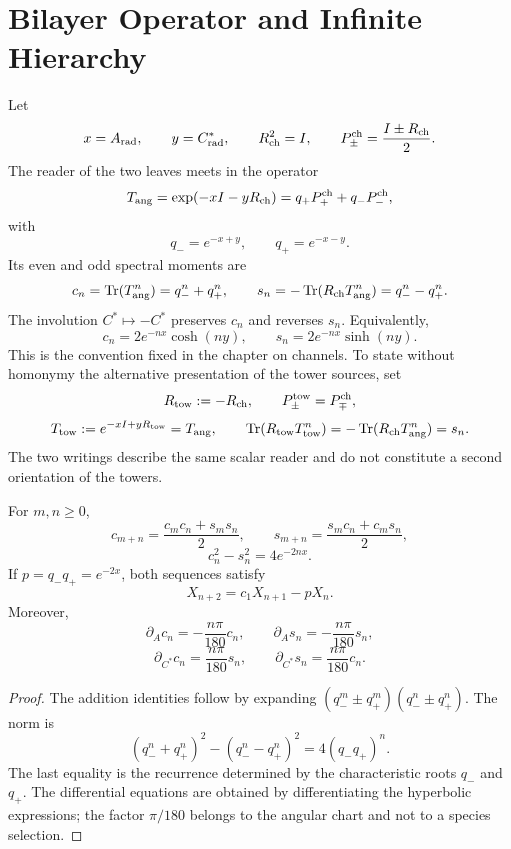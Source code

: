 \section{Bilayer Operator and Infinite Hierarchy}
\label{sec:jerarquia-espectral-infinita-rev7}

Let
\[
 x=A_{\rm rad},\qquad y=C^*_{\rm rad},\qquad
 R_{\rm ch}^2=I,\qquad
 P_\pm^{\rm ch}=\frac{I\pm R_{\rm ch}}2.
\]
The reader of the two leaves meets in the operator
\[
 T_{\rm ang}=\exp(-xI-yR_{\rm ch})
 =q_+P_+^{\rm ch}+q_-P_-^{\rm ch},
\]
with
\[
 q_-=e^{-x+y},\qquad q_+=e^{-x-y}.
\]
Its even and odd spectral moments are
\[
 c_n=\operatorname{Tr}(T_{\rm ang}^n)=q_-^n+q_+^n,\qquad
 s_n=-\operatorname{Tr}(R_{\rm ch}T_{\rm ang}^n)=q_-^n-q_+^n.
\]
The involution \(C^*\mapsto-C^*\) preserves \(c_n\) and reverses \(s_n\).
Equivalently,
\[
 c_n=2e^{-nx}\cosh(ny),\qquad
 s_n=2e^{-nx}\sinh(ny).
\]
This is the convention fixed in the chapter on channels. To state without
homonymy the alternative presentation of the tower sources, set
\[
 R_{\rm tow}:=-R_{\rm ch},\qquad
 P_\pm^{\rm tow}=P_\mp^{\rm ch},
\]
\[
 T_{\rm tow}:=e^{-xI+yR_{\rm tow}}=T_{\rm ang},\qquad
 \operatorname{Tr}(R_{\rm tow}T_{\rm tow}^n)
 =-\operatorname{Tr}(R_{\rm ch}T_{\rm ang}^n)=s_n.
\]
The two writings describe the same scalar reader and do not constitute a
second orientation of the towers.

\begin{theorem}
\label{thm:recurrencia-bicapa-rev7}
For \(m,n\ge0\),
\[
 c_{m+n}=\frac{c_mc_n+s_ms_n}{2},\qquad
 s_{m+n}=\frac{s_mc_n+c_ms_n}{2},
\]
\[
 c_n^2-s_n^2=4e^{-2nx}.
\]
If \(p=q_-q_+=e^{-2x}\), both sequences satisfy
\[
 X_{n+2}=c_1X_{n+1}-pX_n.
\]
Moreover,
\[
 \partial_Ac_n=-\frac{n\pi}{180}c_n,
 \qquad
 \partial_As_n=-\frac{n\pi}{180}s_n,
\]
\[
 \partial_{C^*}c_n=\frac{n\pi}{180}s_n,
 \qquad
 \partial_{C^*}s_n=\frac{n\pi}{180}c_n.
\]
\end{theorem}

\begin{proof}
The addition identities follow by expanding
\((q_-^m\pm q_+^m)(q_-^n\pm q_+^n)\). The norm is
\[
 (q_-^n+q_+^n)^2-(q_-^n-q_+^n)^2
 =4(q_-q_+)^n.
\]
The last equality is the recurrence determined by the characteristic
roots \(q_-\) and \(q_+\). The differential equations are obtained
by differentiating the hyperbolic expressions; the factor \(\pi/180\) belongs to
the angular chart and not to a species selection.
\end{proof}

